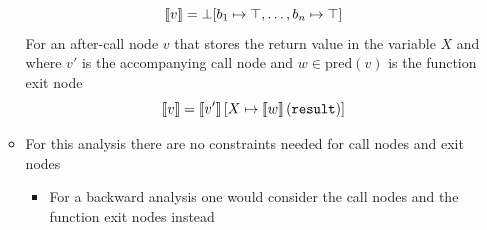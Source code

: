 \begin{itemize}
\begin{itemize}
\begin{equation*}
      \left\llbracket v\right\rrbracket = \bot[b_1 \mapsto \top, \dots, b_n \mapsto \top]
    \end{equation*}
    For an after-call node $v$ that stores the return value in the variable $X$ and where $v'$ is the accompanying call node and $w \in \text{pred}(v)$ is the function exit node 
    \begin{equation*}
      \left\llbracket v\right\rrbracket = \left\llbracket v'\right\rrbracket[X \mapsto \left\llbracket w\right\rrbracket(\mathtt{result})]
    \end{equation*}
    \item For this analysis there are no constraints needed for call nodes and exit nodes
    \begin{itemize}
    	\item For a backward analysis one would consider the call nodes and the function exit nodes instead 
    \end{itemize}
  \end{itemize}
\end{itemize}

